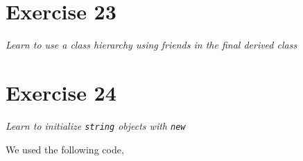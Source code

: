 \documentclass[12pt]{article}
\newcommand{\desc}[1]{\textit{#1} \vspace{1em}}
\begin{document}


\clearpage

\section*{Exercise 23}
\desc{Learn to use a class hierarchy using friends in the final derived class}

\clearpage

\section*{Exercise 24}
\desc{Learn to initialize \texttt{string} objects with \texttt{new}}

We used the following code,







\clearpage
\end{document}
